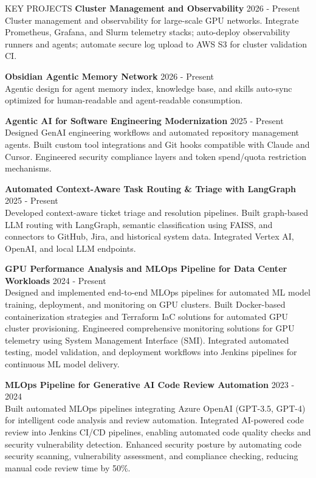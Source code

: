 \documentclass{resume} %
\begin{document}
\begin{rSection}{KEY PROJECTS}
{\bf Cluster Management and Observability} \hfill {2026 - Present}\\
Cluster management and observability for large-scale GPU networks. Integrate Prometheus, Grafana, and Slurm telemetry stacks; auto-deploy observability runners and agents; automate secure log upload to AWS S3 for cluster validation CI.

{\bf Obsidian Agentic Memory Network} \hfill {2026 - Present}\\
Agentic design for agent memory index, knowledge base, and skills auto-sync optimized for human-readable and agent-readable consumption.

{\bf Agentic AI for Software Engineering Modernization} \hfill {2025 - Present}\\
Designed GenAI engineering workflows and automated repository management agents. Built custom tool integrations and Git hooks compatible with Claude and Cursor. Engineered security compliance layers and token spend/quota restriction mechanisms.

{\bf Automated Context-Aware Task Routing \& Triage with LangGraph} \hfill {2025 - Present}\\
Developed context-aware ticket triage and resolution pipelines. Built graph-based LLM routing with LangGraph, semantic classification using FAISS, and connectors to GitHub, Jira, and historical system data. Integrated Vertex AI, OpenAI, and local LLM endpoints.

{\bf GPU Performance Analysis and MLOps Pipeline for Data Center Workloads} \hfill {2024 - Present}\\
Designed and implemented end-to-end MLOps pipelines for automated ML model training, deployment, and monitoring on GPU clusters. Built Docker-based containerization strategies and Terraform IaC solutions for automated GPU cluster provisioning. Engineered comprehensive monitoring solutions for GPU telemetry using System Management Interface (SMI). Integrated automated testing, model validation, and deployment workflows into Jenkins pipelines for continuous ML model delivery.

{\bf MLOps Pipeline for Generative AI Code Review Automation} \hfill {2023 - 2024}\\
Built automated MLOps pipelines integrating Azure OpenAI (GPT-3.5, GPT-4) for intelligent code analysis and review automation. Integrated AI-powered code review into Jenkins CI/CD pipelines, enabling automated code quality checks and security vulnerability detection. Enhanced security posture by automating code security scanning, vulnerability assessment, and compliance checking, reducing manual code review time by 50\%.


\end{rSection}
\end{document}

